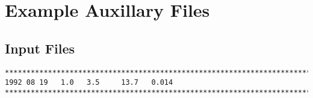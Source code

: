 \chapter{Example Auxillary Files}\label{ChapAppendAuxFiles}
\section{Input Files}\label{ChapAppendSecInputFile}
\small
\begin{verbatim}
*******************************************************************************
1992 08 19   1.0   3.5     13.7   0.014
*******************************************************************************
\end{verbatim}
\normalsize

